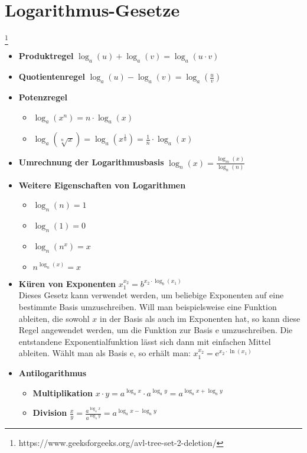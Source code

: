 \documentclass[jou,apacite]{apa6}
\begin{document}
\section{Logarithmus-Gesetze}\footnote{https://www.geeksforgeeks.org/avl-tree-set-2-deletion/}
\begin{itemize}
    \item{\bfseries Produktregel} $\log_{a}(u) + \log_{a}(v) = \log_{a}(u \cdot v)$
    \item{\bfseries Quotientenregel} $\log_{a}(u) - \log_{a}(v) = \log_{a}(\frac{u}{v})$
    \item{\bfseries Potenzregel}
    \begin{itemize}
        \item $\log_{a}(x^{n}) = n\cdot\log_{a}(x)$
        \item $\log_{a}(\sqrt[n]{x}) = \log_{a}(x^{\frac{1}{n}}) = \frac{1}{n}\cdot\log_{a}(x)$
    \end{itemize}
    \item{\bfseries Umrechnung der Logarithmusbasis} $\log_{n}(x) = \frac{\log_{m}(x)}{\log_{n}{(n)}}$
    \item{\bfseries Weitere Eigenschaften von Logarithmen}
    \begin{itemize}
        \item $\log_{n}(n) = 1$
        \item $\log_{n}(1) = 0$
        \item $\log_{n}(n^{x}) = x$
        \item $n^{\log_{n}(x)} = x$
    \end{itemize}
    \item{\bfseries Küren von Exponenten} $x_{1}^{x_{2}} = b^{x_{2}\cdot\log_{b}(x_{1})}$ \\
    Dieses Gesetz kann verwendet werden, um beliebige Exponenten auf eine bestimmte Basis umzuschreiben. Will man beispielsweise eine Funktion ableiten, die sowohl $x$ in der Basis als auch im Exponenten hat, so kann diese Regel angewendet werden, um die Funktion zur Basis $\mathrm{e}$ umzuschreiben. Die entstandene Exponentialfunktion lässt sich dann mit einfachen Mittel ableiten.
    Wählt man als Basis $\mathrm{e}$, so erhält man:
    $x_{1}^{x_{2}} = \mathrm{e}^{x_{2}\cdot\ln(x_{1})}$
    \item{\bfseries Antilogarithmus}
    \begin{itemize}
        \item{\bfseries Multiplikation} $x \cdot y = a^{\log_{a}x}\cdot a^{\log_{a}y} = a^{\log_{a}x + \log_{a}y}$
        \item{\bfseries Division} $\frac{x}{y} = \frac{a^{\log_{a}x}}{a^{\log_{a}y}} = a^{\log_{a}x-\log_{a}y}$
    \end{itemize}
\end{itemize}
\end{document}
